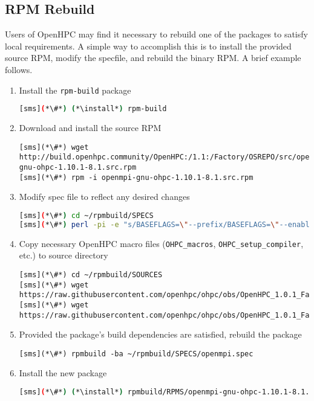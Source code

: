 \subsection{RPM Rebuild}  \label{appendix:rpmbuild}

Users of OpenHPC may find it necessary to rebuild one of the packages to satisfy
local requirements. A simple way to accomplish this is to install the provided
source RPM, modify the specfile, and rebuild the binary RPM. A brief example
follows.

\begin{enumerate}
\item Install the \texttt{rpm-build} package

\begin{lstlisting}[language=bash,keywords={}]
[sms](*\#*) (*\install*) rpm-build
\end{lstlisting}

\item Download and install the source RPM 
\begin{lstlisting}
[sms](*\#*) wget http://build.openhpc.community/OpenHPC:/1.1:/Factory/OSREPO/src/openmpi-gnu-ohpc-1.10.1-8.1.src.rpm
[sms](*\#*) rpm -i openmpi-gnu-ohpc-1.10.1-8.1.src.rpm
\end{lstlisting}

\item Modify spec file to reflect any desired changes

\begin{lstlisting}[language=bash,keywords={}]
[sms](*\#*) cd ~/rpmbuild/SPECS
[sms](*\#*) perl -pi -e "s/BASEFLAGS=\"--prefix/BASEFLAGS=\"--enable-mpi-thread-multiple --prefix/" openmpi.spec
\end{lstlisting}

\item Copy necessary OpenHPC macro files (\texttt{OHPC\_macros}, 
\texttt{OHPC\_setup\_compiler}, etc.) to source directory

\begin{lstlisting}
[sms](*\#*) cd ~/rpmbuild/SOURCES
[sms](*\#*) wget https://raw.githubusercontent.com/openhpc/ohpc/obs/OpenHPC_1.0.1_Factory/components/OHPC_macros
[sms](*\#*) wget https://raw.githubusercontent.com/openhpc/ohpc/obs/OpenHPC_1.0.1_Factory/components/OHPC_setup_compiler
\end{lstlisting}

\item Provided the package's build dependencies are satisfied, rebuild the
package

\begin{lstlisting}
[sms](*\#*) rpmbuild -ba ~/rpmbuild/SPECS/openmpi.spec
\end{lstlisting}

\item Install the new package

\begin{lstlisting}[language=bash,keywords={}]
[sms](*\#*) (*\install*) rpmbuild/RPMS/openmpi-gnu-ohpc-1.10.1-8.1.x86_64
\end{lstlisting}
\end{enumerate}
